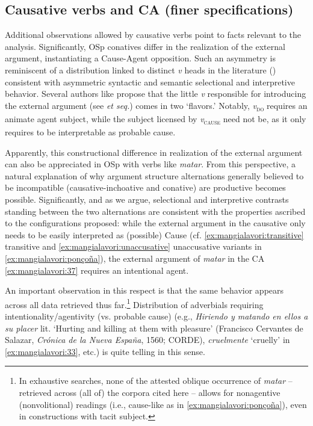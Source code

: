 \documentclass[output=paper,colorlinks,citecolor=brown,
]{langscibook}
\begin{document}
\subsection{Causative verbs and CA (finer specifications)}\label{sec:mangialavori:4-1}
Additional observations allowed by causative verbs point to facts relevant to the analysis. Significantly, OSp conatives differ in the realization of the external argument, instantiating a Cause-Agent opposition. Such an asymmetry is reminiscent of a distribution linked to distinct \textit{v} heads in the literature (\citealt{Chomsky1995}) consistent with asymmetric syntactic and semantic selectional and interpretive behavior. Several authors like \citet{FolliAndHarley2005,FolliAndHarley2007} propose that the little \textit{v} responsible for introducing the external argument (see \citealt{Kratzer1996} \textit{et seq.}) comes in two ‘flavors.’ Notably, \textit{v}\textsubscript{\textsc{do}} requires an animate agent subject, while the subject licensed by \textit{v}\textsubscript{\textsc{cause}} need not be, as it only requires to be interpretable as probable cause. 

Apparently, this constructional difference in realization of the external argument can also be appreciated in OSp with verbs like \textit{matar}. From this perspective, a natural explanation of why argument structure alternations generally believed to be incompatible (causative-inchoative and conative) are productive becomes possible. Significantly, and as we argue, selectional and interpretive contrasts standing between the two alternations are consistent with the properties ascribed to the configurations proposed: while the external argument in the causative only needs to be easily interpreted as (possible) Cause (cf.  \ref{ex:mangialavori:transitive} transitive and  \ref{ex:mangialavori:unaccusative} unaccusative variants in  \ref{ex:mangialavori:ponçoña}), the external argument of \textit{matar} in the CA  \ref{ex:mangialavori:37} requires an intentional agent. 

An important observation in this respect is that the same behavior appears across all data retrieved thus far.\footnote{In exhaustive searches, none of the attested oblique occurrence of \textit{matar} -- retrieved across (all of) the corpora cited here -- allows for nonagentive (nonvolitional) readings (i.e., cause-like as in  \ref{ex:mangialavori:ponçoña}), even in constructions with tacit subject.} Distribution of adverbials requiring intentionality/agentivity (vs. probable cause) (e.g., \textit{Hiriendo y matando en ellos a su placer} lit. ‘Hurting and killing at them with pleasure’ (Francisco Cervantes de Salazar, \textit{Crónica de la Nueva España}, 1560; CORDE), \textit{cruelmente} ‘cruelly’ in  \ref{ex:mangialavori:33}, etc.) is quite telling in this sense. 
\end{document}
